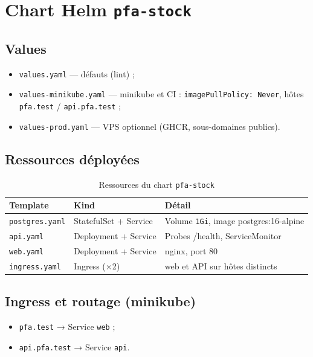 \section{Chart Helm \texttt{pfa-stock}}

\subsection{Values}

\begin{itemize}
  \item \texttt{values.yaml} — défauts (lint) ;
  \item \texttt{values-minikube.yaml} — minikube et CI : \texttt{imagePullPolicy: Never}, hôtes \texttt{pfa.test} / \texttt{api.pfa.test} ;
  \item \texttt{values-prod.yaml} — VPS optionnel (GHCR, sous-domaines publics).
\end{itemize}

\subsection{Ressources déployées}

\begin{table}[htbp]
  \centering
  \caption{Ressources du chart \texttt{pfa-stock}}
  \label{tab:helm-resources}
  \small
  \begin{tabular}{@{}llp{7.5cm}@{}}
    \toprule
    \textbf{Template} & \textbf{Kind} & \textbf{Détail} \\
    \midrule
    \texttt{postgres.yaml} & StatefulSet + Service & Volume \texttt{1Gi}, image postgres:16-alpine \\
    \texttt{api.yaml} & Deployment + Service & Probes /health, ServiceMonitor \\
    \texttt{web.yaml} & Deployment + Service & nginx, port 80 \\
    \texttt{ingress.yaml} & Ingress (×2) & web et API sur hôtes distincts \\
    \bottomrule
  \end{tabular}
\end{table}

\subsection{Ingress et routage (minikube)}

\begin{itemize}
  \item \texttt{pfa.test} → Service \texttt{web} ;
  \item \texttt{api.pfa.test} → Service \texttt{api}.
\end{itemize}

